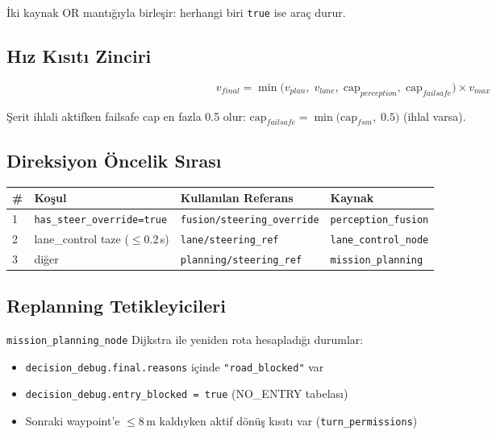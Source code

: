 \documentclass[11pt,a4paper]{article}
\begin{document}
İki kaynak OR mantığıyla birleşir: herhangi biri \texttt{true} ise araç durur.

\subsection{Hız Kısıtı Zinciri}

\[
v_{final} = \min\!\bigl(
  v_{plan},\;
  v_{lane},\;
  \text{cap}_{perception},\;
  \text{cap}_{failsafe}
\bigr) \times v_{max}
\]

Şerit ihlali aktifken failsafe cap en fazla 0.5 olur:
$\text{cap}_{failsafe} = \min\bigl(\text{cap}_{fsm},\; 0.5\bigr)$ (ihlal varsa).

\subsection{Direksiyon Öncelik Sırası}

\begin{center}
\begin{tabular}{@{}p{0.5cm}p{4.5cm}p{5cm}p{4cm}@{}}
\toprule
\textbf{\#} & \textbf{Koşul} & \textbf{Kullanılan Referans} & \textbf{Kaynak} \\
\midrule
1 & \texttt{has\_steer\_override=true} & \texttt{fusion/steering\_override}  & \texttt{perception\_fusion} \\
2 & lane\_control taze ($\leq$0.2\,s)  & \texttt{lane/steering\_ref}         & \texttt{lane\_control\_node} \\
3 & diğer                              & \texttt{planning/steering\_ref}     & \texttt{mission\_planning} \\
\bottomrule
\end{tabular}
\end{center}

\subsection{Replanning Tetikleyicileri}

\texttt{mission\_planning\_node} Dijkstra ile yeniden rota hesapladığı durumlar:

\begin{itemize}[noitemsep, topsep=4pt]
  \item \texttt{decision\_debug.final.reasons} içinde \texttt{"road\_blocked"} var
  \item \texttt{decision\_debug.entry\_blocked = true} (NO\_ENTRY tabelası)
  \item Sonraki waypoint'e $\leq$8\,m kaldıyken aktif dönüş kısıtı var
        (\texttt{turn\_permissions})
\end{itemize}
\end{document}
